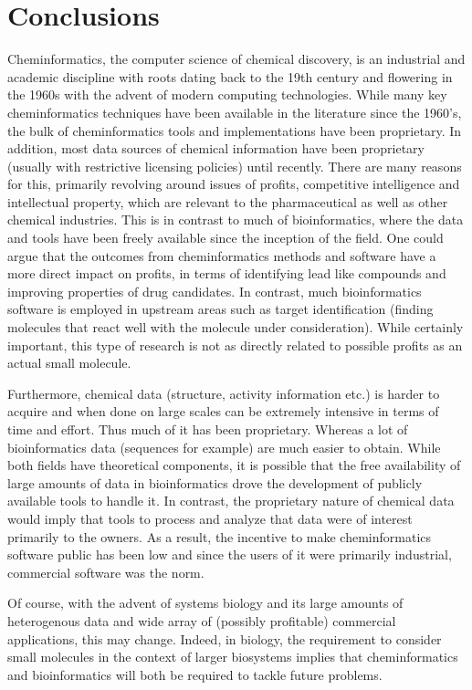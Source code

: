 \documentclass{sig-alternate}
\begin{document}
%
\section{Conclusions}
\label{sec:conclusions}
Cheminformatics, the computer science of chemical discovery, is an
industrial and academic discipline with roots dating back to the 19th
century and flowering in the 1960s with the advent of modern computing
technologies. While many key cheminformatics techniques have been
available in the literature since the 1960's, the bulk of
cheminformatics tools and implementations have been proprietary. In
addition, most data sources of chemical information have been
proprietary (usually with restrictive licensing policies) until
recently. There are many reasons for this, primarily revolving around
issues of profits, competitive intelligence and intellectual property,
which are relevant to the pharmaceutical as well as other chemical
industries. This is in contrast to much of bioinformatics, where the
data and tools have been freely available since the inception of the
field. One could argue that the outcomes from cheminformatics methods
and software have a more direct impact on profits, in terms of
identifying lead like compounds and improving properties of drug
candidates. In contrast, much bioinformatics software is employed in
upstream areas such as target identification (finding molecules that react well with the molecule under consideration).  While certainly
important, this type of research is not as directly related to
possible profits as an actual small molecule.

Furthermore, chemical data (structure, activity information etc.) is
harder to acquire and when done on large scales can be extremely
intensive in terms of time and effort. Thus much of it has been
proprietary. Whereas a lot of bioinformatics data (sequences for
example) are much easier to obtain. While both fields have theoretical
components, it is possible that the free availability of large amounts
of data in bioinformatics drove the development of publicly
available tools to handle it. In contrast, the proprietary nature of
chemical data would imply that tools to process and analyze that data
were of interest primarily to the owners. As a result, the incentive
to make cheminformatics software public has been low and since the
users of it were primarily industrial, commercial software was the
norm.

Of course, with the advent of systems biology and its large amounts of
heterogenous data and wide array of (possibly profitable) commercial
applications, this may change. Indeed, in biology, the
requirement to consider small molecules in the context of larger
biosystems implies that cheminformatics and bioinformatics will both
be required to tackle future problems.
\end{document}
